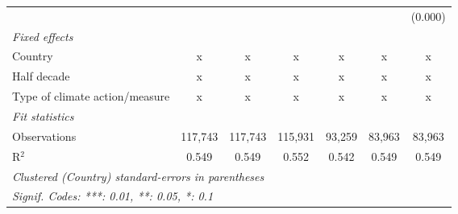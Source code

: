 \begin{tabular}{lcccccc}
                                                    &             &                &               &                &                & (0.000)\\   
   \emph{Fixed effects}\\
   Country                                          & x           & x              & x             & x              & x              & x\\  
   Half decade                                      & x           & x              & x             & x              & x              & x\\  
   Type of climate action/measure                   & x           & x              & x             & x              & x              & x\\  
   \midrule \emph{Fit statistics}\\
   Observations                                     & 117,743     & 117,743        & 115,931       & 93,259         & 83,963         & 83,963\\  
   R$^2$                                            & 0.549       & 0.549          & 0.552         & 0.542          & 0.549          & 0.549\\  
   \midrule
   \multicolumn{7}{l}{\emph{Clustered (Country) standard-errors in parentheses}}\\
   \multicolumn{7}{l}{\emph{Signif. Codes: ***: 0.01, **: 0.05, *: 0.1}}\\
\end{tabular}
\par\endgroup



